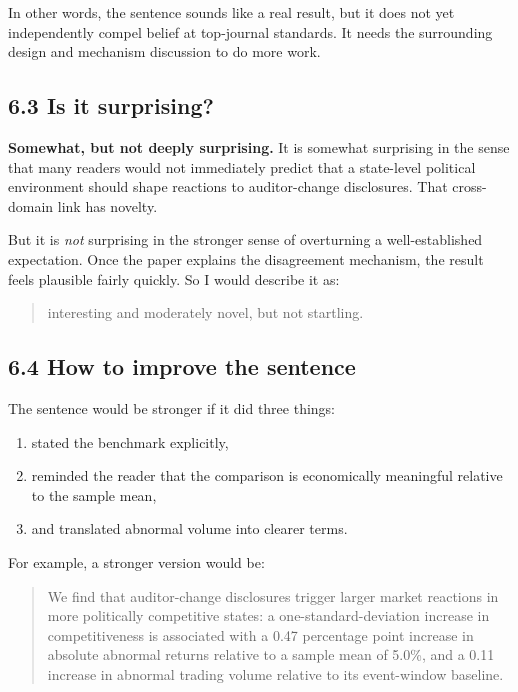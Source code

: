 In other words, the sentence sounds like a real result, but it does not yet independently compel belief at top-journal standards. It needs the surrounding design and mechanism discussion to do more work.

\subsection*{6.3 Is it surprising?}

\textbf{Somewhat, but not deeply surprising.} It is somewhat surprising in the sense that many readers would not immediately predict that a state-level political environment should shape reactions to auditor-change disclosures. That cross-domain link has novelty.

But it is \emph{not} surprising in the stronger sense of overturning a well-established expectation. Once the paper explains the disagreement mechanism, the result feels plausible fairly quickly. So I would describe it as:
\begin{quote}
interesting and moderately novel, but not startling.
\end{quote}

\subsection*{6.4 How to improve the sentence}

The sentence would be stronger if it did three things:
\begin{enumerate}[leftmargin=1.5em]
    \item stated the benchmark explicitly,
    \item reminded the reader that the comparison is economically meaningful relative to the sample mean,
    \item and translated abnormal volume into clearer terms.
\end{enumerate}

For example, a stronger version would be:

\begin{quote}
We find that auditor-change disclosures trigger larger market reactions in more politically competitive states: a one-standard-deviation increase in competitiveness is associated with a 0.47 percentage point increase in absolute abnormal returns relative to a sample mean of 5.0\%, and a 0.11 increase in abnormal trading volume relative to its event-window baseline.
\end{quote}

